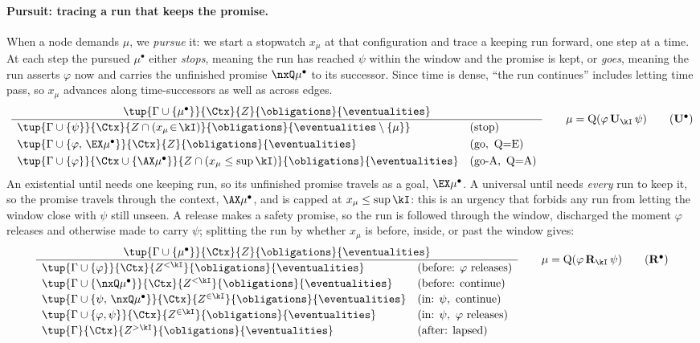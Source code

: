 \paragraph{Pursuit: tracing a run that keeps the promise.}
When a node demands $\mu$, we \emph{pursue} it: we start a stopwatch $x_\mu$ at that configuration and trace
a keeping run forward, one step at a time. At each step the pursued $\mu^\bullet$ either \emph{stops},
meaning the run has reached $\psi$ within the window and the promise is kept, or \emph{goes}, meaning the
run asserts $\varphi$ now and carries the unfinished promise $\nxQ\mu^\bullet$ to its successor. Since time
is dense, ``the run continues'' includes letting time pass, so $x_\mu$ advances along time-successors as
well as across edges.
\[
\frac{\tup{\Gamma\cup\{\mu^\bullet\}}{\Ctx}{Z}{\obligations}{\eventualities}}
{\begin{array}{ll}
\tup{\Gamma\cup\{\psi\}}{\Ctx}{Z\cap(x_\mu\!\in\!\kI)}{\obligations}{\eventualities\setminus\{\mu\}} & (\text{stop})\\[3pt]
\tup{\Gamma\cup\{\varphi,\,\EX\mu^\bullet\}}{\Ctx}{Z}{\obligations}{\eventualities} & (\text{go},\ \mathrm{Q}{=}\mathrm{E})\\[3pt]
\tup{\Gamma\cup\{\varphi\}}{\Ctx\cup\{\AX\mu^\bullet\}}{Z\cap(x_\mu\le\sup\kI)}{\obligations}{\eventualities} & (\text{go-A},\ \mathrm{Q}{=}\mathrm{A})
\end{array}}
\qquad \mu=\mathrm{Q}(\varphi\,\mathbf{U}_\kI\,\psi)
\tag{$\mathbf{U}^\bullet$}\label{tag:Uunf}
\]
An existential until needs one keeping run, so its unfinished promise travels as a goal, $\EX\mu^\bullet$.
A universal until needs \emph{every} run to keep it, so the promise travels through the context,
$\AX\mu^\bullet$, and is capped at $x_\mu\le\sup\kI$: this is an urgency that forbids any run from letting
the window close with $\psi$ still unseen. A release makes a safety promise, so the run is followed through
the window, discharged the moment $\varphi$ releases and otherwise made to carry $\psi$; splitting the run
by whether $x_\mu$ is before, inside, or past the window gives:
\[
\frac{\tup{\Gamma\cup\{\mu^\bullet\}}{\Ctx}{Z}{\obligations}{\eventualities}}
{\begin{array}{ll}
\tup{\Gamma\cup\{\varphi\}}{\Ctx}{Z^{<\kI}}{\obligations}{\eventualities} & (\text{before: }\varphi\text{ releases})\\[2pt]
\tup{\Gamma\cup\{\nxQ\mu^\bullet\}}{\Ctx}{Z^{<\kI}}{\obligations}{\eventualities} & (\text{before: continue})\\[2pt]
\tup{\Gamma\cup\{\psi,\,\nxQ\mu^\bullet\}}{\Ctx}{Z^{\in\kI}}{\obligations}{\eventualities} & (\text{in: }\psi,\text{ continue})\\[2pt]
\tup{\Gamma\cup\{\varphi,\psi\}}{\Ctx}{Z^{\in\kI}}{\obligations}{\eventualities} & (\text{in: }\psi,\ \varphi\text{ releases})\\[2pt]
\tup{\Gamma}{\Ctx}{Z^{>\kI}}{\obligations}{\eventualities} & (\text{after: lapsed})
\end{array}}
\qquad \mu=\mathrm{Q}(\varphi\,\mathbf{R}_\kI\,\psi)
\tag{$\mathbf{R}^\bullet$}\label{tag:Runf}
\]

